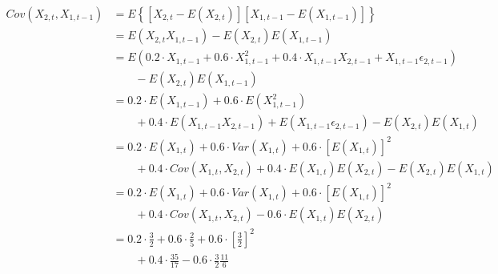\begin{solution}
\begin{equation}
\begin{aligned}
Cov(X_{2,t},X_{1,t-1}) 	& = E\left\{[X_{2,t} - E(X_{2,t})][X_{1,t-1} - E(X_{1,t-1})]\right\} \\
												& = E(X_{2,t}X_{1,t-1}) - E(X_{2,t})E(X_{1,t-1}) \\
												& = E(0.2 \cdot X_{1,t-1} + 0.6 \cdot X_{1,t-1}^2 + 0.4 \cdot X_{1,t-1}X_{2,t-1} + X_{1,t-1}\epsilon_{2,t-1}) \\
								 & \qquad - E(X_{2,t})E(X_{1,t-1}) \\
												& = 0.2 \cdot E(X_{1,t-1}) + 0.6 \cdot E(X_{1,t-1}^2) \\
								 & \qquad + 0.4 \cdot E(X_{1,t-1}X_{2,t-1}) + E(X_{1,t-1}\epsilon_{2,t-1}) - E(X_{2,t})E(X_{1,t}) \\
												& = 0.2 \cdot E(X_{1,t}) + 0.6 \cdot Var(X_{1,t}) + 0.6 \cdot \left[E(X_{1,t})\right]^2 \\
								 & \qquad + 0.4 \cdot Cov(X_{1,t},X_{2,t}) + 0.4 \cdot E(X_{1,t})E(X_{2,t}) - E(X_{2,t})E(X_{1,t}) \\
								        & = 0.2 \cdot E(X_{1,t}) + 0.6 \cdot Var(X_{1,t}) + 0.6 \cdot \left[E(X_{1,t})\right]^2 \\
								 & \qquad + 0.4 \cdot Cov(X_{1,t},X_{2,t}) - 0.6 \cdot E(X_{1,t})E(X_{2,t})\\
												& = 0.2 \cdot \frac{3}{2} + 0.6 \cdot \frac{2}{5} + 0.6 \cdot \left[\frac{3}{2}\right]^2 \\
								 & \qquad + 0.4 \cdot \frac{35}{17} - 0.6 \cdot \frac{3}{2}\frac{11}{6}
\end{aligned}
\end{equation}


\end{solution}